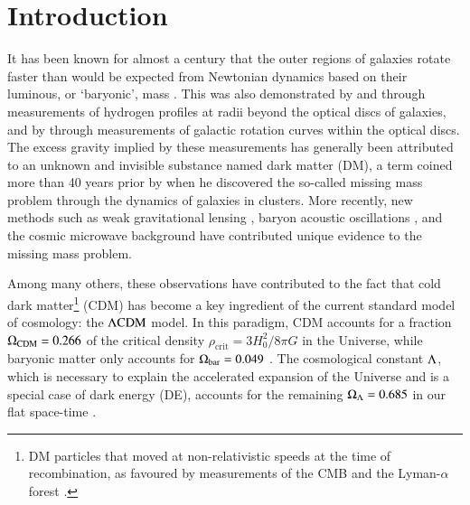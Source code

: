\documentclass{aa}
\renewcommand{\Upomega}{{\rm \Omega}}
\renewcommand{\Uplambda}{{\rm \Lambda}}
\newcommand{\lcdm}{{\rm \Lambda CDM}}
\newcommand{\un}[1]{_{\rm #1}}
\begin{document}
\maketitle

\clearpage




\section{Introduction}
\label{sec:Introduction}

It has been known for almost a century that the outer regions of galaxies rotate faster than would be expected from Newtonian dynamics based on their luminous, or `baryonic', mass \cite[]{kapteyn1922,oort1932,oort1940,babcock1939}. This was also demonstrated by \cite{gottesman1966} and \cite{bosma1981} through measurements of hydrogen profiles at radii beyond the optical discs of galaxies, and by \cite{rubin1983} through measurements of galactic rotation curves within the optical discs. The excess gravity implied by these measurements has generally been attributed to an unknown and invisible substance named dark matter (DM), a term coined more than 40 years prior by \cite{zwicky1933} when he discovered the so-called missing mass problem through the dynamics of galaxies in clusters. More recently, new methods such as weak gravitational lensing \cite[]{hoekstra2004,mandelbaum2006,clowe2006,heymans2013,linden2014}, baryon acoustic oscillations \cite[]{eisenstein2005,blake2011}, and the cosmic microwave background \cite[CMB;][]{debernardis2000,spergel2003,planck2014} have contributed unique evidence to the missing mass problem.

Among many others, these observations have contributed to the fact that cold dark matter\footnote{DM particles that moved at non-relativistic speeds at the time of recombination, as favoured by measurements of the CMB \cite[]{planck2014} and the Lyman-$\alpha$ forest \cite[]{viel2013}.} (CDM) has become a key ingredient of the current standard model of cosmology: the $\lcdm$ model. In this paradigm, CDM accounts for a fraction $\Upomega\un{CDM}=0.266$ of the critical density $\rho_\textrm{crit}=3H_0^2/8\pi G$ in the Universe, while baryonic matter only accounts for $\Upomega\un{bar}=0.049$ \cite[]{planck2020}. The cosmological constant $\Uplambda$, which is necessary to explain the accelerated expansion of the Universe \cite[]{riess1998,perlmutter1999} and is a special case of dark energy (DE), accounts for the remaining $\Upomega\un{\Lambda}=0.685$ in our flat space-time \cite[]{debernardis2000}.
\end{document}
